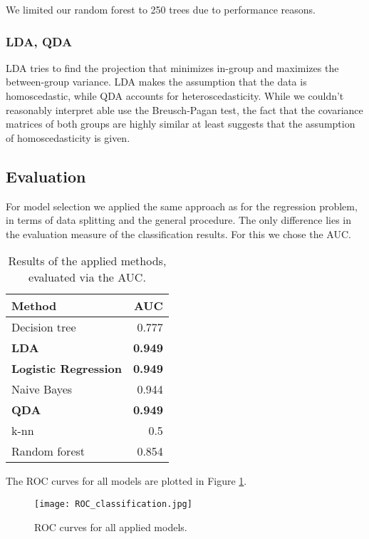 \documentclass[a4paper]{article}
\begin{document}
We limited our random forest to 250 trees due to performance reasons.
\subsubsection{LDA, QDA}%
LDA tries to find the projection that minimizes in-group and maximizes the between-group variance. LDA makes the assumption that the data is homoscedastic, while QDA accounts for heteroscedasticity. While we couldn't reasonably interpret able use the Breusch-Pagan test, the fact that the covariance matrices of both groups are highly similar at least suggests that the assumption of homoscedasticity is given.

\subsection{Evaluation}
\label{sec:Evaluation}
For model selection we applied the same approach as for the regression problem, in terms of data splitting and the general procedure. The only difference lies in the evaluation measure of the classification results. For this we chose the AUC.

\begin{table}[H]
\begin{tabular}{|l|r|}
\hline
Method & AUC \\\hline
Decision tree & 0.777\\
\textbf{LDA} & \textbf{0.949}\\
\textbf{Logistic Regression} & \textbf{0.949}\\
Naive Bayes& 0.944\\
\textbf{QDA}& \textbf{0.949}\\
k-nn& 0.5\\
Random forest& 0.854\\
\hline
\end{tabular}
\caption{Results of the applied methods, evaluated via the AUC.}
\end{table}

The ROC curves for all models are plotted in Figure \ref{fig:roc_classification}. 
\begin{figure}[H]
	\centering

\texttt{[image: ROC\_classification.jpg]}
 	\caption{\label{fig:roc_classification} ROC curves for all applied models.}
\end{figure}
 
\end{document}
